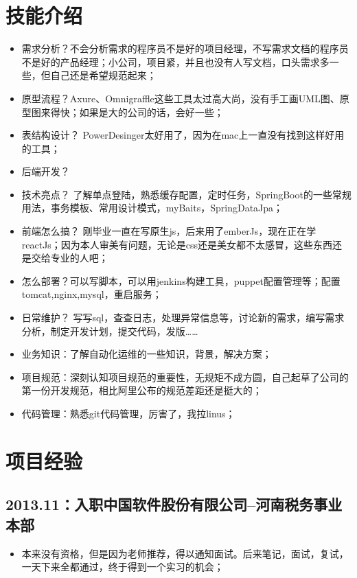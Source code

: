 \documentclass[11pt]{article}
\begin{document}
\section*{技能介绍}
\label{sec:orgheadline2}
\begin{itemize}
\item 需求分析？不会分析需求的程序员不是好的项目经理，不写需求文档的程序员不是好的产品经理；小公司，项目紧，并且也没有人写文档，口头需求多一些，但自己还是希望规范起来；
\item 原型流程？Axure、Omnigraffle这些工具太过高大尚，没有手工画UML图、原型图来得快；如果是大的公司的话，会好一些；
\item 表结构设计？ PowerDesinger太好用了，因为在mac上一直没有找到这样好用的工具；

\item 后端开发？
\item 技术亮点？ 了解单点登陆，熟悉缓存配置，定时任务，SpringBoot的一些常规用法，事务模板、常用设计模式，myBaits，SpringDataJpa；
\item 前端怎么搞？ 刚毕业一直在写原生js，后来用了emberJs，现在正在学reactJs；因为本人审美有问题，无论是css还是美女都不太感冒，这些东西还是交给专业的人吧；
\item 怎么部署？可以写脚本，可以用jenkins构建工具，puppet配置管理等；配置tomcat,nginx,mysql，重启服务；
\item 日常维护？ 写写sql，查查日志，处理异常信息等，讨论新的需求，编写需求分析，制定开发计划，提交代码，发版\ldots{}\ldots{}
\item 业务知识：了解自动化运维的一些知识，背景，解决方案；
\item 项目规范：深刻认知项目规范的重要性，无规矩不成方圆，自己起草了公司的第一份开发规范，相比阿里公布的规范差距还是挺大的；
\item 代码管理：熟悉git代码管理，厉害了，我拉linus；
\end{itemize}

\section*{项目经验}
\label{sec:orgheadline12}
\subsection*{2013.11：入职中国软件股份有限公司--河南税务事业本部}
\label{sec:orgheadline3}
\begin{itemize}
\item 本来没有资格，但是因为老师推荐，得以通知面试。后来笔记，面试，复试，一天下来全都通过，终于得到一个实习的机会；
\end{itemize}
\end{document}
